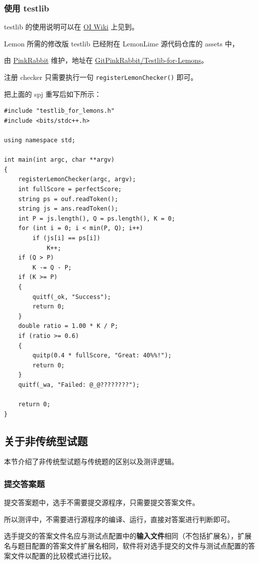 \documentclass[UTF-8]{ctexart}
\begin{document}
			\subsubsection{使用 testlib}

				testlib 的使用说明可以在 \href{https://oi-wiki.org/intro/testlib/}{OI Wiki} 上见到。

				Lemon 所需的修改版 testlib 已经附在 LemonLime 源代码仓库的 assets 中，

				由 \href{https://github.com/GitPinkRabbit}{PinkRabbit} 维护，地址在 \href{https://github.com/GitPinkRabbit/Testlib-for-Lemons}{GitPinkRabbit/Testlib-for-Lemons}。

				注册 checker 只需要执行一句 \texttt{registerLemonChecker()} 即可。

				把上面的 spj 重写后如下所示：

				\begin{verbatim}
#include "testlib_for_lemons.h"
#include <bits/stdc++.h>

using namespace std;

int main(int argc, char **argv)
{
	registerLemonChecker(argc, argv);
	int fullScore = perfectScore;
	string ps = ouf.readToken();
	string js = ans.readToken();
	int P = js.length(), Q = ps.length(), K = 0;
	for (int i = 0; i < min(P, Q); i++)
		if (js[i] == ps[i])
			K++;
	if (Q > P)
		K -= Q - P;
	if (K >= P)
	{
		quitf(_ok, "Success");
		return 0;
	}
	double ratio = 1.00 * K / P;
	if (ratio >= 0.6)
	{
		quitp(0.4 * fullScore, "Great: 40%%!");
		return 0;
	}
	quitf(_wa, "Failed: @_@????????");

	return 0;
}
				\end{verbatim}


		\subsection{关于非传统型试题}

			本节介绍了非传统型试题与传统题的区别以及测评逻辑。

			\subsubsection{提交答案题}

				提交答案题中，选手不需要提交源程序，只需要提交答案文件。

				所以测评中，不需要进行源程序的编译、运行，直接对答案进行判断即可。

				选手提交的答案文件名应与测试点配置中的\textbf{输入文件}相同（不包括扩展名），扩展名与题目配置的答案文件扩展名相同，软件将对选手提交的文件与测试点配置的答案文件以配置的比较模式进行比较。
\end{document}
